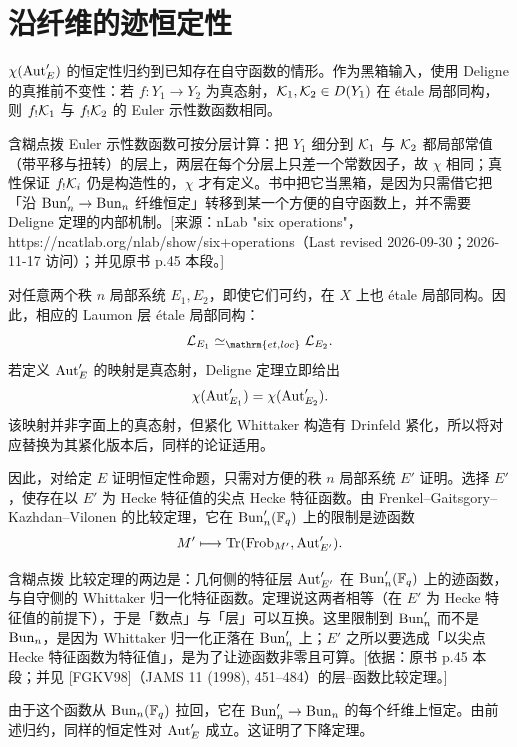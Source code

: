 \section{沿纤维的迹恒定性}\label{sec:8.3}
$\chi(\operatorname{Aut}'_E)$ 的恒定性归约到已知存在自守函数的情形。作为黑箱输入，使用 Deligne 的真推前不变性：若 $f:Y_1\to Y_2$ 为真态射，$\mathcal{K}_1,\mathcal{K}_2\in D(Y_1)$ 在 étale 局部同构，则 $f_!\mathcal{K}_1$ 与 $f_!\mathcal{K}_2$ 的 Euler 示性数函数相同。
\begin{transnote}{含糊点拨}
Euler 示性数函数可按分层计算：把 $Y_1$ 细分到 $\mathcal{K}_1$ 与 $\mathcal{K}_2$ 都局部常值（带平移与扭转）的层上，两层在每个分层上只差一个常数因子，故 $\chi$ 相同；真性保证 $f_!\mathcal{K}_i$ 仍是构造性的，$\chi$ 才有定义。书中把它当黑箱，是因为只需借它把「沿 $\operatorname{Bun}'_n\to\operatorname{Bun}_n$ 纤维恒定」转移到某一个方便的自守函数上，并不需要 Deligne 定理的内部机制。[来源：nLab "six operations"，https://ncatlab.org/nlab/show/six+operations（Last revised 2026-09-30；2026-11-17 访问）；并见原书 p.45 本段。]
\end{transnote}

对任意两个秩 $n$ 局部系统 $E_1,E_2$，即使它们可约，在 $X$ 上也 étale 局部同构。因此，相应的 Laumon 层 étale 局部同构：
\[\cL_{E_1}\simeq_{\mathrm{et,loc}}\cL_{E_2}.\]
若定义 $\operatorname{Aut}'_E$ 的映射是真态射，Deligne 定理立即给出
\[\chi(\operatorname{Aut}'_{E_1})=\chi(\operatorname{Aut}'_{E_2}).\]
该映射并非字面上的真态射，但紧化 Whittaker 构造有 Drinfeld 紧化，所以将对应替换为其紧化版本后，同样的论证适用。

因此，对给定 $E$ 证明恒定性命题，只需对方便的秩 $n$ 局部系统 $E'$ 证明。选择 $E'$，使存在以 $E'$ 为 Hecke 特征值的尖点 Hecke 特征函数。由 Frenkel–Gaitsgory–Kazhdan–Vilonen 的比较定理，它在 $\operatorname{Bun}'_n(\mathbb F_q)$ 上的限制是迹函数
\[M'\longmapsto\operatorname{Tr}(\operatorname{Frob}_{M'},\operatorname{Aut}'_{E'}).\]
\begin{transnote}{含糊点拨}
比较定理的两边是：几何侧的特征层 $\operatorname{Aut}'_{E'}$ 在 $\operatorname{Bun}'_n(\mathbb F_q)$ 上的迹函数，与自守侧的 Whittaker 归一化特征函数。定理说这两者相等（在 $E'$ 为 Hecke 特征值的前提下），于是「数点」与「层」可以互换。这里限制到 $\operatorname{Bun}'_n$ 而不是 $\operatorname{Bun}_n$，是因为 Whittaker 归一化正落在 $\operatorname{Bun}'_n$ 上；$E'$ 之所以要选成「以尖点 Hecke 特征函数为特征值」，是为了让迹函数非零且可算。[依据：原书 p.45 本段；并见 [FGKV98]（JAMS 11 (1998), 451–484）的层–函数比较定理。]
\end{transnote}
由于这个函数从 $\operatorname{Bun}_n(\mathbb F_q)$ 拉回，它在 $\operatorname{Bun}'_n\to\operatorname{Bun}_n$ 的每个纤维上恒定。由前述归约，同样的恒定性对 $\operatorname{Aut}'_E$ 成立。这证明了下降定理。
